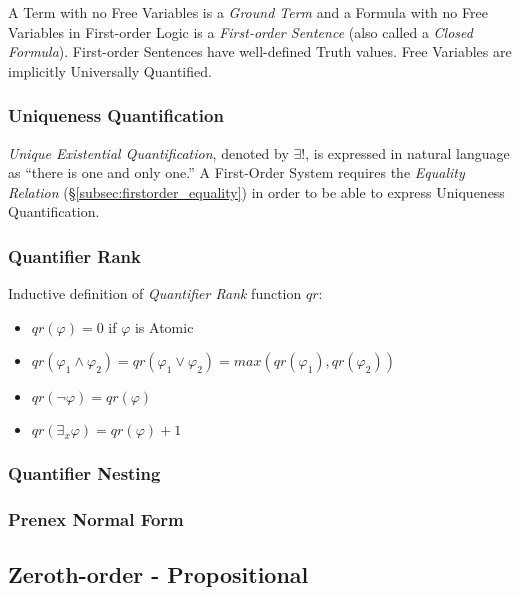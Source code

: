 \documentclass{article}
\begin{document}
A Term with no Free Variables is a \emph{Ground Term} and a Formula
with no Free Variables in First-order Logic is a \emph{First-order
  Sentence} (also called a \emph{Closed Formula}). First-order
Sentences have well-defined Truth values. Free Variables are
implicitly Universally Quantified.

\subsubsection{Uniqueness Quantification}\hfill

\emph{Unique Existential Quantification}, denoted by $\exists !$,
is expressed in natural language as ``there is one and only one.'' A
First-Order System requires the \emph{Equality Relation}
(\S\ref{subsec:firstorder_equality}) in order to be able to express
Uniqueness Quantification.



\subsubsection{Quantifier Rank}

Inductive definition of \emph{Quantifier Rank} function $qr$:
\begin{itemize}
\item $qr(\varphi) = 0$ if $\varphi$ is Atomic
\item $qr(\varphi_1 \wedge \varphi_2) = qr(\varphi_1 \vee \varphi_2) = max(qr(\varphi_1),qr(\varphi_2))$
\item $qr(\neg \varphi) = qr(\varphi)$
\item $qr(\exists_x \varphi) = qr(\varphi) + 1$
\end{itemize}



\subsubsection{Quantifier Nesting}




\subsubsection{Prenex Normal Form}\label{subsec:prenex_normal}



\subsection{Zeroth-order - Propositional}\label{subsec:propositional}
\end{document}
